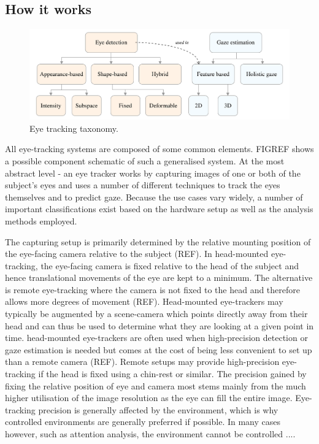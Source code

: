 \subsection{How it works}
\begin{figure}
	\includegraphics[width=1\textwidth]{figures/model/taxonomy}
	\caption{Eye tracking taxonomy.}\label{fig:taxonomy}
\end{figure}
All eye-tracking systems are composed of some common elements. FIGREF shows a possible component schematic of such a generalised system. At the most abstract level - an eye tracker works by capturing images of one or both of the subject's eyes and uses a number of different techniques to track the eyes themselves and to predict gaze. Because the use cases vary widely, a number of important classifications exist based on the hardware setup as well as the analysis methods employed.

The capturing setup is primarily determined by the relative mounting position of the eye-facing camera relative to the subject (REF). In \gls{head-mounted} \gls{eye-tracking},  the eye-facing camera is fixed relative to the head of the subject and hence translational movements of the eye are kept to a minimum. The alternative is remote \gls{eye-tracking} where the camera is not fixed to the head and therefore allows more degrees of movement (REF). Head-mounted eye-trackers may typically be augmented by a \gls{scene-camera} which points directly away from their head and can thus be used to determine what they are looking at a given point in time. \Gls{head-mounted} \gls{eye-tracker}s are often used when high-precision detection or gaze estimation is needed but comes at the cost of being less convenient to set up than a remote camera (REF). Remote setups may provide high-precision eye-tracking if the head is fixed using a chin-rest or similar. The precision gained by fixing the relative position of eye and camera most stems mainly from the much higher utilisation of the image resolution as the eye can fill the entire image. Eye-tracking precision is generally affected by the environment, which is why controlled environments are generally preferred if possible. In many cases however, such as attention analysis, the environment cannot be controlled .... 

